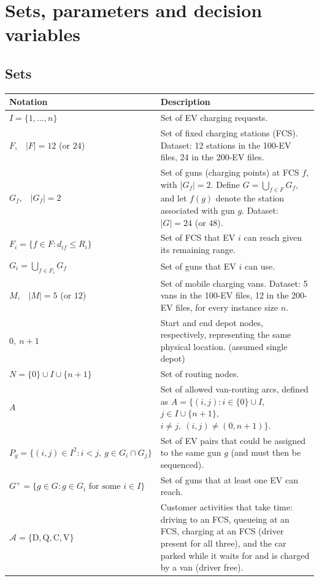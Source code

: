 \documentclass[12pt,a4paper]{article}
\begin{document}
\newpage
\section{Sets, parameters and decision variables}

\subsection*{Sets}
\begin{tabularx}{\textwidth}{@{}>{\raggedright\arraybackslash}p{4.6cm}X@{}}
\toprule
\textbf{Notation} & \textbf{Description} \\
\midrule
$I=\{1,\dots,n\}$ & Set of EV charging requests. \\[2pt]
$F$,\ \ $|F|=12$ (or $24$) & Set of fixed charging stations (FCS). Dataset: 12 stations in the 100-EV files, 24 in the 200-EV files. \\[2pt]
$G_f$,\ \ $|G_f|=2$ & Set of guns (charging points) at FCS $f$, with $|G_f|=2$. Define $G=\bigcup_{f\in F}G_f$, and let $f(g)$ denote the station associated with gun $g$. Dataset: $|G|=24$ (or $48$). \\[2pt]
$F_i=\{f\in F: d_{if}\le R_i\}$ & Set of FCS that EV $i$ can reach given its remaining range. \\[2pt]
$G_i=\bigcup_{f\in F_i}G_f$ & Set of guns that EV $i$ can use. \\[2pt]
$M$,\ \ $|M|=5$ (or $12$) & Set of mobile charging vans. Dataset: 5 vans in the 100-EV files, 12 in the 200-EV files, for every instance size $n$. \\[2pt]
$0,\ n+1$ & Start and end depot nodes, respectively, representing the same physical location. (assumed single depot) \\[2pt]
$N=\{0\}\cup I\cup\{n+1\}$ & Set of routing nodes. \\[2pt]
$A$ & Set of allowed van-routing arcs, defined as \newline
$A=\{(i,j): i\in\{0\}\cup I,$\newline
\hspace*{3.2em}$j\in I\cup\{n+1\},$\newline
\hspace*{3.2em}$i\ne j,\ (i,j)\ne(0,n+1)\}$. \\[2pt]
$P_g=\{(i,j)\in I^2: i<j,\ g\in G_i\cap G_j\}$ & Set of EV pairs that could be assigned to the same gun $g$ (and must then be sequenced). \\[2pt]
$G^{+}=\{g\in G: g\in G_i \text{ for some } i\in I\}$ & Set of guns that at least one EV can reach. \\[2pt]
$\mathcal A=\{\mathrm D,\mathrm Q,\mathrm C,\mathrm V\}$ & Customer activities that take time: driving to an FCS, queueing at an FCS, charging at an FCS (driver present for all three), and the car parked while it waits for and is charged by a van (driver free). \\
\bottomrule
\end{tabularx}
\end{document}
